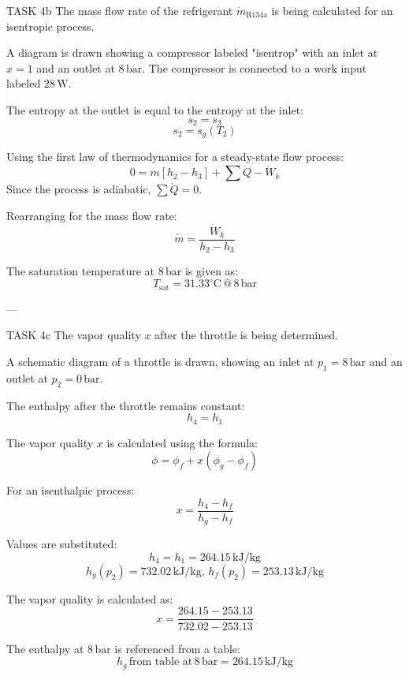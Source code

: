 TASK 4b  
The mass flow rate of the refrigerant \( \dot{m}_{\text{R134a}} \) is being calculated for an isentropic process.  

A diagram is drawn showing a compressor labeled "isentrop" with an inlet at \( x = 1 \) and an outlet at \( 8 \, \text{bar} \). The compressor is connected to a work input labeled \( 28 \, \text{W} \).  

The entropy at the outlet is equal to the entropy at the inlet:  
\[
s_2 = s_3
\]  
\[
s_2 = s_g(T_2)
\]  

Using the first law of thermodynamics for a steady-state flow process:  
\[
0 = \dot{m} [h_2 - h_3] + \sum \dot{Q} - \dot{W}_k
\]  
Since the process is adiabatic, \( \sum \dot{Q} = 0 \).  

Rearranging for the mass flow rate:  
\[
\dot{m} = \frac{\dot{W}_k}{h_2 - h_3}
\]  

The saturation temperature at \( 8 \, \text{bar} \) is given as:  
\[
T_{\text{sat}} = 31.33^\circ \text{C} \, @ \, 8 \, \text{bar}
\]  

---

TASK 4c  
The vapor quality \( x \) after the throttle is being determined.  

A schematic diagram of a throttle is drawn, showing an inlet at \( p_1 = 8 \, \text{bar} \) and an outlet at \( p_2 = 0 \, \text{bar} \).  

The enthalpy after the throttle remains constant:  
\[
h_4 = h_1
\]  

The vapor quality \( x \) is calculated using the formula:  
\[
\phi = \phi_f + x (\phi_g - \phi_f)
\]  

For an isenthalpic process:  
\[
x = \frac{h_4 - h_f}{h_g - h_f}
\]  

Values are substituted:  
\[
h_4 = h_1 = 264.15 \, \text{kJ/kg}
\]  
\[
h_g(p_2) = 732.02 \, \text{kJ/kg}, \, h_f(p_2) = 253.13 \, \text{kJ/kg}
\]  

The vapor quality is calculated as:  
\[
x = \frac{264.15 - 253.13}{732.02 - 253.13}
\]  

The enthalpy at \( 8 \, \text{bar} \) is referenced from a table:  
\[
h_g \, \text{from table at} \, 8 \, \text{bar} = 264.15 \, \text{kJ/kg}
\]  